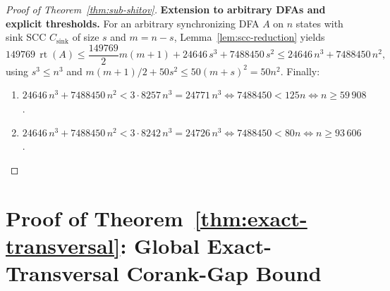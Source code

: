 \documentclass[11pt]{article}
\theoremstyle{definition}
\theoremstyle{remark}
\newcommand{\rt}{\operatorname{rt}}
\begin{document}
\begin{proof}[Proof of Theorem~\ref{thm:sub-shitov}]
\smallskip
\noindent\textbf{Extension to arbitrary DFAs and explicit thresholds.}
For an arbitrary synchronizing DFA $A$ on $n$ states with sink SCC $C_{\mathrm{sink}}$ of size $s$ and $m = n - s$, Lemma~\ref{lem:scc-reduction} yields
\[
  149769\, \rt(A) \le \frac{149769}{2} m(m + 1) + 24646\, s^3 + 7488450\, s^2 \le 24646\, n^3 + 7488450\, n^2,
\]
using $s^3 \le n^3$ and $m(m + 1) / 2 + 50 s^2 \le 50 (m + s)^2 = 50 n^2$. Finally:
\begin{enumerate}[label=(\alph*), leftmargin=2em]
  \item $24646\, n^3 + 7488450\, n^2 < 3 \cdot 8257\, n^3 = 24771\, n^3 \iff 7488450 < 125 n \iff n \ge 59\,908$.
  \item $24646\, n^3 + 7488450\, n^2 < 3 \cdot 8242\, n^3 = 24726\, n^3 \iff 7488450 < 80 n \iff n \ge 93\,606$. \qedhere
\end{enumerate}
\end{proof}

\section{Proof of Theorem~\ref{thm:exact-transversal}: Global Exact-Transversal Corank-Gap Bound}\label{sec:exact-transversal}
\end{document}
